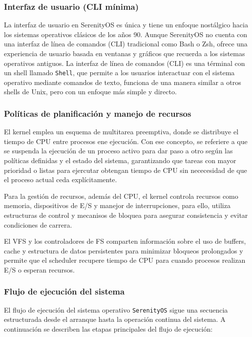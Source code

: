 \subsubsection{Interfaz de usuario (CLI mínima)}
La interfaz de usuario en SerenityOS es única y tiene un enfoque nostálgico hacia los sistemas operativos clásicos de los años 90. Aunque SerenityOS no cuenta con una interfaz de línea de comandos (CLI) tradicional como Bash o Zsh, ofrece una experiencia de usuario basada en ventanas y gráficos que recuerda a los sistemas operativos antiguos. La interfaz de línea de comandos (CLI) es una términal con un shell llamado \texttt{Shell}, que permite a los usuarios interactuar con el sistema operativo mediante comandos de texto, funciona de una manera similar a otros shells de Unix, pero con un enfoque más simple y directo.



\subsubsection{Políticas de planificación y manejo de recursos}
El kernel emplea un esquema de multitarea preemptiva, donde se distribuye el tiempo de CPU entre procesos ene ejecución. Con ese concepto, se referiere a que se suspenda la ejecución de un proceso activo para dar paso  a otro según las políticas definidas y el estado del sistema, garantizando que tareas con mayor prioridad o listas para ejercutar obtengan tiempo de CPU sin nececesidad de que el proceso actual ceda explícitamente. 

Para la gestión de recursos, además del CPU, el kernel controla recursos como memoria, dispositivos de E/S y manejor de interrupciones, para ello, utiliza estructuras de control y mecanisos de bloquea para asegurar consistencia y evitar condiciones de carrera.

El VFS y los controladores de FS comparten información sobre el uso de buffers, cache y estructura de datos persistentes para minimizar bloqueos prolongados y permite que el scheduler recupere tiempo de CPU para cuando procesos realizan E/S o esperan recursos.

\subsubsection{Flujo de ejecución del sistema}
El flujo de ejecución del sistema operativo \texttt{SerenityOS} sigue una secuencia estructurada desde el arranque hasta la operación continua del sistema. A continuación se describen las etapas principales del flujo de ejecución:

